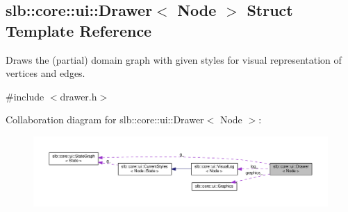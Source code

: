 \hypertarget{structslb_1_1core_1_1ui_1_1Drawer}{}\subsection{slb\+:\+:core\+:\+:ui\+:\+:Drawer$<$ Node $>$ Struct Template Reference}
\label{structslb_1_1core_1_1ui_1_1Drawer}


Draws the (partial) domain graph with given styles for visual representation of vertices and edges.  




{\ttfamily \#include $<$drawer.\+h$>$}



Collaboration diagram for slb\+:\+:core\+:\+:ui\+:\+:Drawer$<$ Node $>$\+:\nopagebreak
\begin{figure}[H]
\begin{center}
\leavevmode
\includegraphics[width=350pt]{structslb_1_1core_1_1ui_1_1Drawer__coll__graph}
\end{center}
\end{figure}
